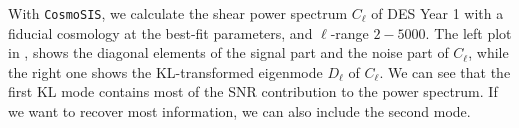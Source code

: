 \documentclass[twocolumn]{\docclass}
\def\bea{\begin{eqnarray}}
\def\eea{\end{eqnarray}}
\def\svs{\nonumber\\}
\begin{document}
	
	With  {\tt CosmoSIS}, we calculate the shear power spectrum $C_{\ell}$ of DES Year 1 with a fiducial cosmology at the best-fit parameters, and $\ell$-range $2-5000$. The left plot in , shows the diagonal elements of the signal part and the noise part of $C_{\ell}$, while the right one shows the KL-transformed eigenmode $D_{\ell}$ of $C_{\ell}$. We can see that the first KL mode contains most of the SNR contribution to the power spectrum. If we want to recover most information, we can also include the second mode.
	
\end{document}
